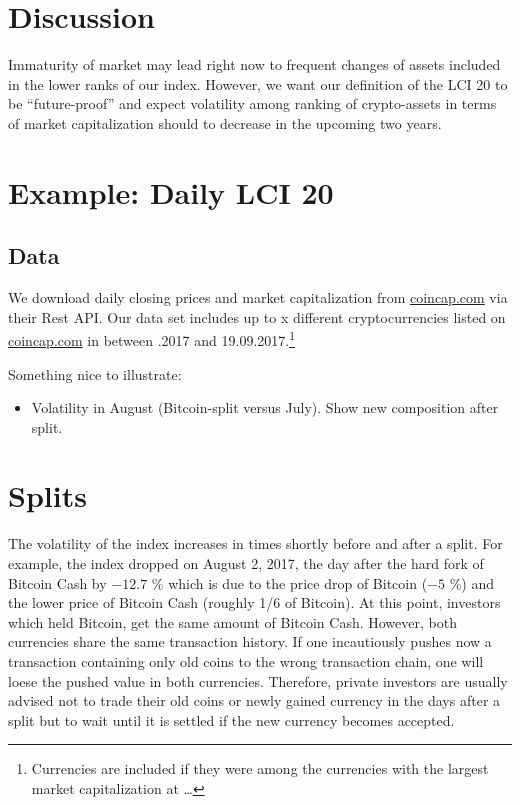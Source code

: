 \documentclass[11pt]{article}
\begin{document}
\section{Discussion}

Immaturity of market may lead right now to frequent changes of assets included in the lower ranks of our index.
However, we want our definition of the LCI 20 to be ``future-proof'' and expect volatility among ranking of crypto-assets in terms of market capitalization should to decrease in the upcoming two years.


\section{Example: Daily LCI 20}

\subsection{Data}

We download daily closing prices and market capitalization from \href{https://coincap.com}{coincap.com} via their Rest API. 
Our data set includes up to x different cryptocurrencies listed on \href{https://coincap.com}{coincap.com} in between .2017 and 19.09.2017.\footnote{Currencies are included if they were among the currencies with the largest market capitalization at \dots}


Something nice to illustrate:
\begin{itemize}
  \item Volatility in August (Bitcoin-split versus July). Show new composition after split.
\end{itemize}

\section{Splits}

The volatility of the index increases in times shortly before and after a split. For example, the index dropped on August 2, 2017, the day after the hard fork of Bitcoin Cash by $-12.7$ \% which is due to the price drop of Bitcoin ($-5$ \%) and the lower price of Bitcoin Cash (roughly 1/6 of Bitcoin). At this point, investors which held Bitcoin, get the same amount of Bitcoin Cash. However, both currencies share the same transaction history. If one incautiously pushes now a transaction containing only old coins to the wrong transaction chain, one will loese the pushed value in both currencies. Therefore, private investors are usually advised not to trade their old coins or newly gained currency in the days after a split but to wait until it is settled if the new currency becomes accepted.




\end{document}
